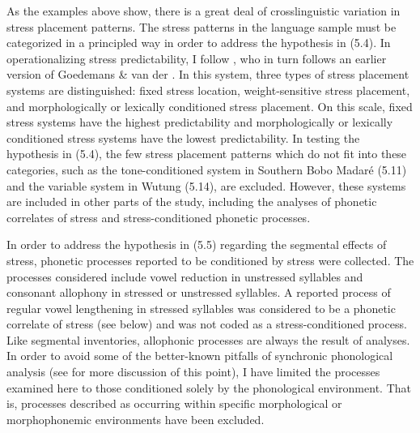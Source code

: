   As the examples above show, there is a great deal of crosslinguistic variation in stress placement patterns. The stress patterns in the language sample must be categorized in a principled way in order to address the hypothesis in (5.4). In operationalizing stress predictability, I follow \citet{Schiering2007}, who in turn follows an earlier version of Goedemans \& van der \citet{Hulst2013a}. In this system, three types of stress placement systems are distinguished: fixed stress location, weight-sensitive stress placement, and morphologically or lexically conditioned stress placement. On this scale, fixed stress systems have the highest predictability and morphologically or lexically conditioned stress systems have the lowest predictability. In testing the hypothesis in (5.4), the few stress placement patterns which do not fit into these categories, such as the tone-conditioned system in Southern Bobo Madaré (5.11) and the variable system in Wutung (5.14), are excluded. However, these systems are included in other parts of the study, including the analyses of phonetic correlates of stress and stress-conditioned phonetic processes.

  In order to address the hypothesis in (5.5) regarding the segmental effects of stress, phonetic processes reported to be conditioned by stress were collected. The processes considered include vowel reduction in unstressed syllables and consonant allophony in stressed or unstressed syllables. A reported process of regular vowel lengthening in stressed syllables was considered to be a phonetic correlate of stress (see below) and was not coded as a stress-conditioned process. Like segmental inventories, allophonic processes are always the result of analyses. In order to avoid some of the better-known pitfalls of synchronic phonological analysis (see  for more discussion of this point), I have limited the processes examined here to those conditioned solely by the phonological environment. That is, processes described as occurring within specific morphological or morphophonemic environments have been excluded.

